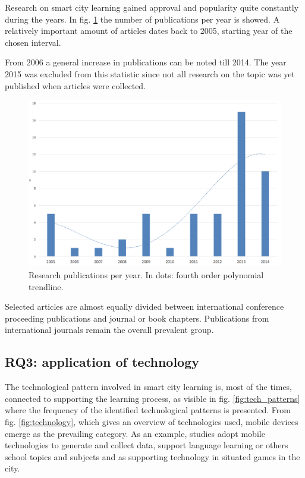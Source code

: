 Research on smart city learning gained approval and popularity quite constantly during the years. In fig. \ref{fig:years} the number of publications per year is showed. A relatively important amount of articles dates back to 2005, starting year of the chosen interval.

From 2006 a general increase in publications can be noted till 2014. The year 2015 was excluded from this statistic since not all research on the topic was yet published when articles were collected.

\begin{figure}[htb]
\centering
\includegraphics[width=12cm]{img/years}
\caption{Research publications per year. In dots: fourth order polynomial trendline.}
\label{fig:years}
\end{figure}

Selected articles are almost equally divided between international conference proceeding publications and journal or book chapters.
Publications from international journals remain the overall prevalent group.


\subsection*{RQ3: application of technology}

The technological pattern involved in smart city learning is, most of the times, connected to supporting the learning process, as visible in fig. \ref{fig:tech_patterns} where the frequency of the identified technological patterns is presented.
From fig. \ref{fig:technology}, which gives an overview of technologies used, mobile devices emerge as the prevailing category.
As an example, studies adopt mobile technologies to generate and collect data\cite{philip_framework_2013}\cite{akkerman_storification_2009-1}, support language learning or others school topics and subjects\cite{gaved_challenges_2014} and as supporting technology in situated games in the city\cite{akkerman_storification_2009-1}\cite{huizenga_cognitive_2008}.

